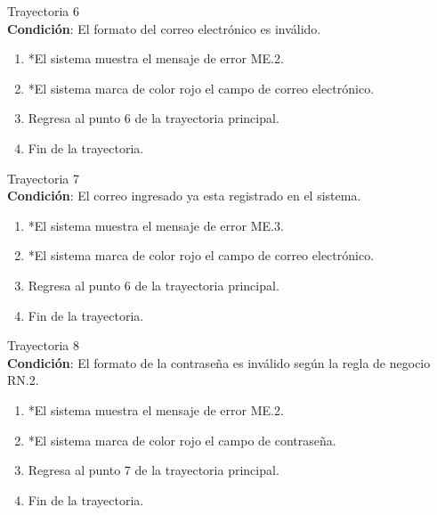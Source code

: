 \large{Trayectoria 6}\\
\textbf{Condición}: El formato del correo electrónico es inválido.
\begin{enumerate}
    \item *El sistema muestra el mensaje de error ME.2.
    \item *El sistema marca de color rojo el campo de correo electrónico.
    \item Regresa al punto 6 de la trayectoria principal.
    \item Fin de la trayectoria.
\end{enumerate}
\large{Trayectoria 7}\\
\textbf{Condición}: El correo ingresado ya esta registrado en el sistema.
\begin{enumerate}
    \item *El sistema muestra el mensaje de error ME.3.
    \item *El sistema marca de color rojo el campo de correo electrónico.
    \item Regresa al punto 6 de la trayectoria principal.
    \item Fin de la trayectoria.
\end{enumerate}
\large{Trayectoria 8}\\
\textbf{Condición}: El formato de la contraseña es inválido según la regla de negocio RN.2.
\begin{enumerate}
    \item *El sistema muestra el mensaje de error ME.2.
    \item *El sistema marca de color rojo el campo de contraseña.
    \item Regresa al punto 7 de la trayectoria principal.
    \item Fin de la trayectoria.
\end{enumerate}